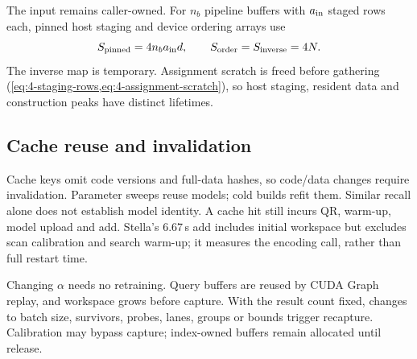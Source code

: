 The input remains caller-owned. For $n_b$ pipeline buffers with
$a_{\rm in}$ staged rows each, pinned host staging and device ordering
arrays use
\[
 S_{\rm pinned}=4n_ba_{\rm in}d,\qquad
 S_{\rm order}=S_{\rm inverse}=4N.
\]
The inverse map is temporary. Assignment scratch is freed before
gathering (\cref{eq:4-staging-rows,eq:4-assignment-scratch}), so host
staging, resident data and construction peaks have distinct lifetimes.

\subsection{Cache reuse and invalidation}

Cache keys omit code versions and full-data hashes, so code/data changes
require invalidation. Parameter sweeps reuse models; cold builds refit
them. Similar recall alone does not establish model identity. A cache
hit still incurs QR, warm-up, model upload and add. Stella's 6.67\,s add
includes initial workspace but excludes scan calibration and search
warm-up; it measures the encoding call, rather than full restart time.

Changing $\alpha$ needs no retraining. Query buffers are reused by CUDA
Graph replay, and workspace grows before capture. With the result count
fixed, changes to batch size, survivors, probes, lanes, groups or bounds
trigger recapture. Calibration may bypass capture; index-owned buffers
remain allocated until release.

